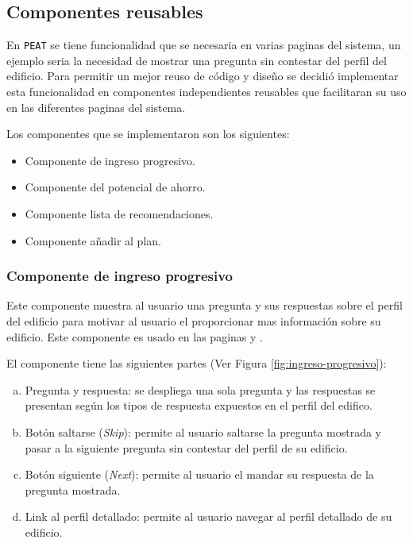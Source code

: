 \subsection{Componentes reusables}
\label{subsec:componentes}

En \texttt{PEAT} se tiene funcionalidad que se necesaria en varias paginas del
sistema, un ejemplo seria la necesidad de mostrar una pregunta sin contestar del
perfil del edificio.
Para permitir un mejor reuso de código y diseño se decidió implementar esta
funcionalidad en componentes independientes reusables que facilitaran su uso
en las diferentes paginas del sistema.

Los componentes que se implementaron son los siguientes:
\begin{itemize}
\item Componente de ingreso progresivo.
\item Componente del potencial de ahorro.
\item Componente lista de recomendaciones.
\item Componente añadir al plan.
\end{itemize}


\subsubsection{Componente de ingreso progresivo}

Este componente muestra al usuario una pregunta y sus respuestas sobre el
perfil del edificio para motivar al usuario el proporcionar mas información
sobre su edificio. Este componente es usado en las paginas 
y .

El componente tiene las siguientes partes (Ver Figura \ref{fig:ingreso-progresivo}):
\begin{enumerate}[a)]
\item Pregunta y respuesta: se despliega una sola pregunta y
  las respuestas se presentan según los tipos de respuesta expuestos
  en el perfil del edifico.
\item Botón saltarse (\textit{Skip}): permite al usuario saltarse
  la pregunta mostrada y pasar a la siguiente pregunta sin contestar del perfil
  de su edificio.
\item Botón siguiente (\textit{Next}): permite al usuario el mandar
  su respuesta de la pregunta mostrada.
\item Link al perfil detallado: permite al usuario navegar al perfil
  detallado de su edificio.
\end{enumerate}

